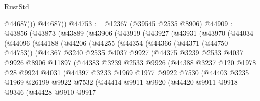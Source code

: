 \begin{lexlean}{RustStd}
\begin{coremodule}
              @44687)))
        @44687))
@44753 := @12367 (@39545 @2535 @8906)
@44909 := @43856
    (@43873
      (@43889
        (@43906
          (@43919
            (@43927
              (@43931
                (@43970
                  (@44034
                    (@44096
                      (@44188
                        (@44206
                          (@44255
                            (@44354
                              (@44366
                                (@44371 (@44750 @44753))
                                (@44367
                                  @3240
                                  @2535
                                  @4037
                                  @9927
                                  (@44375
                                    @3239
                                    @2533
                                    @4037
                                    @9926
                                    @8906
                                    @11897
                                    (@44383
                                      @3239
                                      @2533
                                      @9926
                                      (@44388
                                        @3237
                                        @120
                                        @1978
                                        @28
                                        @9924
                                        @4031
                                        (@44397
                                          @3233
                                          @1969
                                          @1977
                                          @9922
                                          @7530
                                          (@44403
                                            @3235
                                            @1969
                                            @26199
                                            @9922
                                            @7532
                                            (@44414
                                              @9911
                                              @9920
                                              (@44420
                                                @9911
                                                @9918
                                                @9346
                                                (@44428
                                                  @9910
                                                  @9917

\end{coremodule}
\end{lexlean}
